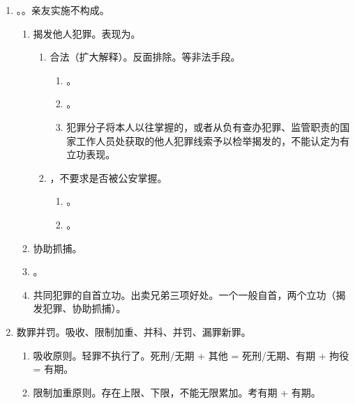 \begin{enumerate}
\begin{enumerate}
        \end{enumerate}
  \item {}。。亲友实施不构成。
        \begin{enumerate}
          \item 揭发他人犯罪。表现为。
                \begin{enumerate}
                  \item 合法（扩大解释）。反面排除。等非法手段。
                        \begin{enumerate}
                          \item {}。
                          \item {}。
                          \item 犯罪分子将本人以往掌握的，或者从负有查办犯罪、监管职责的国家工作人员处获取的他人犯罪线索予以检举揭发的，不能认定为有立功表现。
                        \end{enumerate}
                  \item {}，不要求是否被公安掌握。
                        \begin{enumerate}
                          \item {}。
                          \item {}。
                        \end{enumerate}
                \end{enumerate}
          \item 协助抓捕。
          \item {}。
          \item 共同犯罪的自首立功。出卖兄弟三项好处。一个一般自首，两个立功（揭发犯罪、协助抓捕）。
        \end{enumerate}
  \item 数罪并罚。吸收、限制加重、并科、并罚、漏罪新罪。
        \begin{enumerate}
          \item 吸收原则。轻罪不执行了。死刑/无期 + 其他 = 死刑/无期、有期 + 拘役 = 有期。
          \item 限制加重原则。存在上限、下限，不能无限累加。考有期 + 有期。
                \begin{enumerate}

\end{enumerate}
\end{enumerate}
\end{enumerate}
